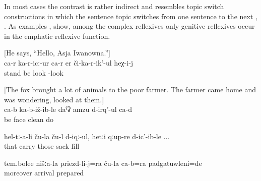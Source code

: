 In most cases the contrast is rather indirect and resembles topic switch constructions in which the sentence topic switches from one sentence to the next , . As examples ,  show, among the complex reflexives only genitive reflexives occur in the emphatic reflexive function. 
%
\begin{exe}
	\ex	\label{ex:He says, Hello, Asja Iwanowna@3b} [He says, ``Hello, Asja Iwanowna.'']\\
	\gll	ca-r	ka-r-icː-ur	ca-r	er či-ka-r-ik'-ul	heχ-i-j\\
			stand	be	look -look	\\
	\glt	{}

	\ex	\label{ex:‎‎Itself (the fox itself) is sitting and cleaning its face@3d} [The fox brought a lot of animals to the poor farmer. The farmer came home and was wondering, looked at them.]\\
	\gll	ca-b	ka-b-iž-ib-le	daˁʡ	amzu	d-irq'-ul	ca-d\\
			be	face	clean	do	\\
	\glt	{}

	\ex	\label{ex:They themselves were carrying the sacks and when they were filled@15a}
	\gll	hel-tː-a-li	ču-la	ču-l	d-iqː-ul,	hetːi	qːup-re	d-ic'-ib-le ...\\
		that			carry	those	sack	fill\\
	\glt	{}

	\ex	\label{ex:Moreover, (the Icari people) themselves were prepared for our coming@15b}
	\gll	tem.bolee	nišːa-la	priezd-li-j=ra	ču-la	ca-b=ra	padgatuwleni=de\\
		moreover		arrival			prepared\\
	\glt	{}
\end{exe}
	
